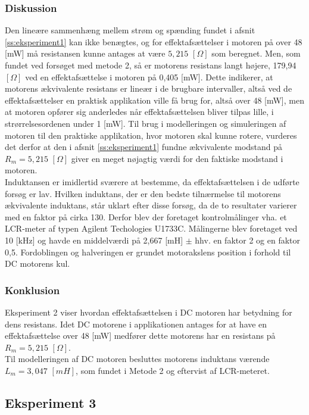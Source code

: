 \subsubsection{Diskussion}
Den lineære sammenhæng mellem strøm og spænding fundet i afsnit \ref{ss:eksperiment1} kan ikke benægtes,
og for effektafsættelser i motoren på over 48 [mW] må resistansen kunne antages at være \(5,215\) \([\Omega]\)  som beregnet.
Men, som fundet ved forsøget med metode 2, så er motorens resistans langt højere,
179,94 \([\Omega]\) ved en effektafsættelse i motoren på 0,405 [mW].
Dette indikerer, at motorens ækvivalente resistans er lineær i de brugbare intervaller, altså ved de effektafsættelser en
praktisk applikation ville få brug for, altså over 48 [mW], men at motoren opfører sig anderledes når effektafsættelsen
bliver tilpas lille, i strørrelsesordenen under 1 [mW].
Til brug i modelleringen og simuleringen af motoren til den praktiske applikation, hvor motoren skal kunne rotere,
vurderes det derfor at den i afsnit \ref{ss:eksperiment1} fundne ækvivalente modstand på \(R_m=5,215\) \([\Omega]\) giver en meget nøjagtig værdi for den faktiske modstand i motoren.\\

Induktansen er imidlertid sværere at bestemme, da effektafsættelsen i de udførte forsøg er lav.
Hvilken induktans, der er den bedste tilnærmelse til motorens ækvivalente induktans,
står uklart efter disse forsøg, da de to resultater varierer med en faktor på cirka 130. Derfor blev der foretaget kontrolmålinger vha. et LCR-meter af typen Agilent Techologies U1733C. Målingerne blev foretaget ved 10 [kHz] og havde en middelværdi på 2,667 [mH] \(\pm\) hhv. en faktor 2 og en faktor 0,5. 
Fordoblingen og halveringen er grundet motorakslens position i forhold til DC motorens kul.\\

\subsubsection{Konklusion}
Eksperiment 2 viser hvordan effektafsættelsen i DC motoren har betydning for dens resistans. Idet DC motorene i applikationen antages for at have en effektafsættelse over 48 [mW] medfører dette motorens har en resistans på \(R_m=5,215\) \([\Omega]\).\\
Til modelleringen af DC motoren besluttes motorens induktans værende \(L_m=3,047\) \([mH]\), som fundet i Metode 2 og eftervist af LCR-meteret.

\subsection{Eksperiment 3}
\label{ss:eksperiment3}
